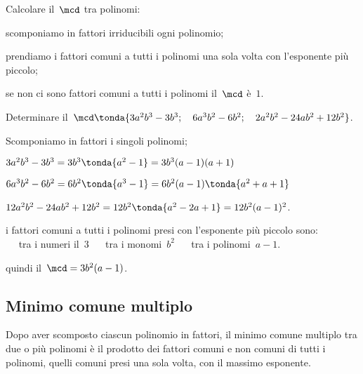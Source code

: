 \begin{procedura}
Calcolare il~\(\mcd\) tra polinomi:
\begin{enumeratea}
\item scomponiamo in fattori irriducibili ogni polinomio;
\item prendiamo i fattori comuni a tutti i polinomi una sola volta con 
l'esponente più piccolo;
\item se non ci sono fattori comuni a tutti i polinomi il~\(\mcd\) è~\(1\).
\end{enumeratea}
\end{procedura}

 \begin{esempio}
Determinare il~\(\mcd \tonda{3a^{2}b^{3}-3b^{3};\quad 6a^{3}b^{2}-6b^{2}; 
                      \quad 2a^{2}b^{2}-24ab^{2}+12b^{2}} \).
 \begin{itemize*}
 \item Scomponiamo in fattori i singoli polinomi;
  \begin{itemize*}
  \item \(3a^{2}b^{3}-3b^{3}=3b^{3} \tonda{a^{2}-1} =3b^{3}(a-1)(a+1)\)
  \item \(6a^{3}b^{2}-6b^{2}=6b^{2} \tonda{a^{3}-1} =
         6b^{2}(a-1) \tonda{a^{2}+a+1} \)
  \item \(12a^{2}b^{2}-24ab^{2}+12b^{2}=12b^{2} \tonda{a^{2}-2a+1} =
         12b^{2}(a-1)^{2}\).
  \end{itemize*}
 \item i fattori comuni a tutti i polinomi presi con l'esponente più piccolo 
  sono: \\
\textcolor{Salmon}{} ~~ tra i numeri il~\(3\) \hfill
\textcolor{Salmon}{} ~~ tra i monomi~\(b^{2}\) \hfill
\textcolor{Salmon}{} ~~ tra i polinomi~\(a-1\).
 \item quindi il~\(\mcd=3b^{2}(a-1)\).
 \end{itemize*}
 \end{esempio}

\subsection{Minimo comune multiplo}
Dopo aver scomposto ciascun polinomio in fattori, il minimo comune multiplo 
tra due o più polinomi è il prodotto dei fattori comuni e non comuni di tutti 
i polinomi, quelli comuni presi una sola volta, con il massimo esponente.

